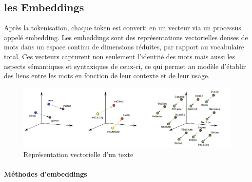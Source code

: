 \subsection{les Embeddings}
\label{ch:2:section:embeddings}

Après la tokenisation, chaque token est converti en un vecteur via un processus appelé embedding. Les embeddings sont des représentations vectorielles denses de mots dans un espace continu de dimensions réduites, par rapport au vocabulaire total. Ces vecteurs capturent non seulement l'identité des mots mais aussi les aspects sémantiques et syntaxiques de ceux-ci, ce qui permet au modèle d'établir des liens entre les mots en fonction de leur contexte et de leur usage.


\begin{figure}[H]
    \centering
    \includegraphics[width=15cm]{gfx/fig-embeddings.png}
    \caption{Représentation vectorielle d'un texte \cite{Anala_2020}}
    \label{fig:crawler-downloading}
\end{figure}


\paragraph{Méthodes d'embeddings} \hspace{0pt}

